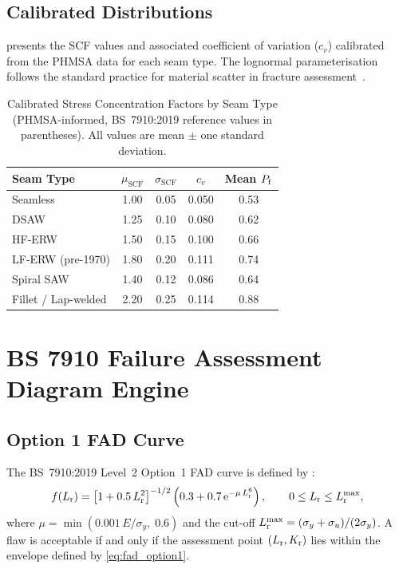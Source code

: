 \subsection{Calibrated Distributions}
\label{subsec:physics_calibration}

 presents the \acs{SCF} values and associated
coefficient of variation ($c_v$) calibrated from the PHMSA data for
each seam type.  The lognormal parameterisation follows the standard
practice for material scatter in fracture assessment~\cite{BS7910:2019,
Anderson2005}.

\begin{table}[htbp]
  \centering
  \caption{Calibrated Stress Concentration Factors by Seam Type
    (PHMSA-informed, BS~7910:2019 reference values in parentheses).
    All values are mean $\pm$ one standard deviation.}
  \label{tab:calibrated_scf}
  \begin{tabular}{@{}lcccc@{}}
    \toprule
    Seam Type & $\mu_\mathrm{SCF}$ & $\sigma_\mathrm{SCF}$ &
    $c_v$ & Mean $P_{\mathrm{f}}$ \\
    \midrule
    Seamless              & 1.00 & 0.05 & 0.050 & 0.53 \\
    DSAW                  & 1.25 & 0.10 & 0.080 & 0.62 \\
    HF-ERW                & 1.50 & 0.15 & 0.100 & 0.66 \\
    LF-ERW (pre-1970)     & 1.80 & 0.20 & 0.111 & 0.74 \\
    Spiral SAW            & 1.40 & 0.12 & 0.086 & 0.64 \\
    Fillet / Lap-welded   & 2.20 & 0.25 & 0.114 & 0.88 \\
    \bottomrule
  \end{tabular}
\end{table}

\section{BS 7910 Failure Assessment Diagram Engine}
\label{sec:physics_fad}

\subsection{Option 1 FAD Curve}
\label{subsec:physics_fad_curve}

The BS~7910:2019 Level~2 Option~1 \ac{FAD} curve is defined by
\cite{BS7910:2019}:
\begin{equation}
  f(L_{\mathrm{r}}) = \left[1 + 0.5\,L_{\mathrm{r}}^2\right]^{-1/2}
    \left(0.3 + 0.7\,\mathrm{e}^{-\mu\,L_{\mathrm{r}}^6}\right),
    \qquad 0 \leq L_{\mathrm{r}} \leq L_{\mathrm{r}}^\mathrm{max},
  \label{eq:fad_option1}
\end{equation}
where $\mu = \min(0.001\,E/\sigma_y,\; 0.6)$ and the cut-off
$L_{\mathrm{r}}^\mathrm{max} = (\sigma_y + \sigma_u)/(2\sigma_y)$.  A flaw is
acceptable if and only if the assessment point $(L_{\mathrm{r}}, K_{\mathrm{r}})$ lies within
the envelope defined by \cref{eq:fad_option1}.

